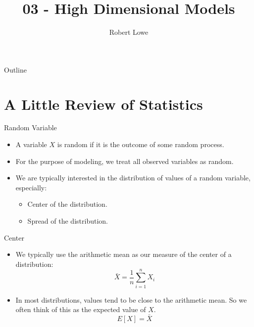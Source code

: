 \documentclass[handout]{beamer}
\title{03 - High Dimensional Models}
\author{Robert Lowe}
\institute[Southeast Missouri State University] %
{
  Department of Computer Science\\
  Southeast Missouri State University
}
\date[]{}
\begin{document}
\begin{frame}
  \titlepage
\end{frame}

\begin{frame}{Outline}
  \tableofcontents
\end{frame}





\section{A Little Review of Statistics}

\begin{frame}{Random Variable}
   \begin{itemize}
       \item A variable $X$ is random if it is the outcome of some random process.
       \item For the purpose of modeling, we treat all observed variables as random.
       \item We are typically interested in the distribution of values of a random variable, especially:
       \begin{itemize}
           \item Center of the distribution.
           \item Spread of the distribution.
       \end{itemize}
   \end{itemize} 
\end{frame}

\begin{frame}{Center}
    \begin{itemize}
        \item We typically use the arithmetic mean as our measure of the center of a distribution:
        \[
        \bar{X} = \dfrac{1}{n}\sum_{i=1}^n X_i
        \]
        \item In most distributions, values tend to be close to the arithmetic mean.
           So we often think of this as the expected value of $X$.
           \[
           E[X] = \bar{X}
           \]
    \end{itemize}
\end{frame}
\end{document}
